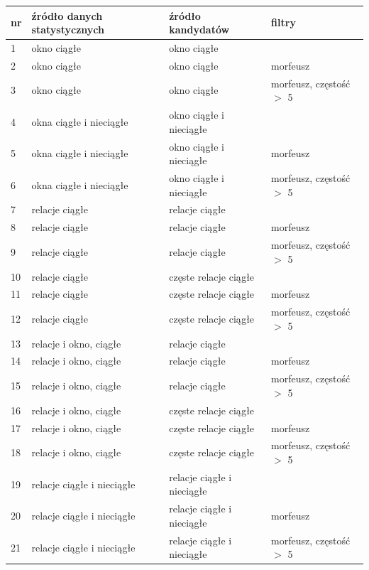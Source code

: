\documentclass[11pt,a4paper]{llncs}
\begin{document}
\begin{table}[h!]
\centering
\footnotesize\setlength{\tabcolsep}{2.5pt}
\begin{tabular}{ l || l | l | l }
	\toprule
	\textbf{nr} 	& \textbf{źródło danych statystycznych}			& \textbf{źródło kandydatów}		& \textbf{filtry}					\\
	\midrule
	1	& okno ciągłe 							& okno ciągłe			&							\\
	2	& okno ciągłe 							& okno ciągłe			& morfeusz					\\
	3	& okno ciągłe 							& okno ciągłe			& morfeusz, częstość $>$ 5	\\
	4	& okna ciągłe i nieciągłe 				& okno ciągłe i nieciągłe			&							\\
	5	& okna ciągłe i nieciągłe 				& okno ciągłe i nieciągłe			& morfeusz					\\
	6	& okna ciągłe i nieciągłe 				& okno ciągłe i nieciągłe			& morfeusz, częstość $>$ 5	\\
	7	& relacje ciągłe						& relacje ciągłe		&							\\
	8	& relacje ciągłe						& relacje ciągłe		& morfeusz					\\
	9	& relacje ciągłe						& relacje ciągłe		& morfeusz, częstość $>$ 5	\\
	10	& relacje ciągłe						& częste relacje ciągłe &							\\
	11	& relacje ciągłe						& częste relacje ciągłe & morfeusz					\\
	12	& relacje ciągłe						& częste relacje ciągłe & morfeusz, częstość $>$ 5	\\
	13	& relacje i okno, ciągłe				& relacje ciągłe		& 							\\
	14	& relacje i okno, ciągłe				& relacje ciągłe 		& morfeusz 					\\
	15	& relacje i okno, ciągłe				& relacje ciągłe		& morfeusz, częstość $>$ 5	\\
	16	& relacje i okno, ciągłe				& częste relacje ciągłe	&							\\
	17	& relacje i okno, ciągłe	 			& częste relacje ciągłe	& morfeusz					\\
	18	& relacje i okno, ciągłe				& częste relacje ciągłe	& morfeusz, częstość $>$ 5	\\
	19	& relacje ciągłe i nieciągłe			& relacje ciągłe i nieciągłe 		& 							\\
	20	& relacje ciągłe i nieciągłe			& relacje ciągłe i nieciągłe		& morfeusz					\\
	21	& relacje ciągłe i nieciągłe			& relacje ciągłe i nieciągłe		& morfeusz, częstość $>$ 5	\\

\end{tabular}
\end{table}
\end{document}
